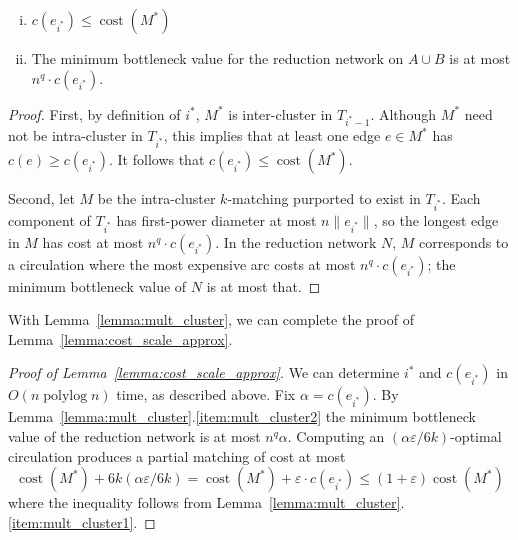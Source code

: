 \documentclass[a4paper,UKenglish]{socg-lipics-v2018}
\def\polylog{\mathop{\mathrm{polylog}}}
\def\eps{\varepsilon}
\def\norm#1{\mathopen\| #1 \mathclose\|}	%
\def\cost{\operatorname{cost}}
\theoremstyle{plain}
\numberwithin{figure}{section}
\begin{document}
\begin{toappendix}
\begin{lemma}
\label{lemma:mult_cluster}
\hspace{2em}
\begin{enumerate}[(i)]
\item \label{item:mult_cluster1}
	$c(e_{i^*}) \leq \cost(M^*)$
\item \label{item:mult_cluster2}
	The minimum bottleneck value for the reduction network on $A \cup B$
	is at most $n^q \cdot c(e_{i^*})$.
\end{enumerate}
\end{lemma}
\begin{proof}
First, by definition of $i^*$, $M^*$ is inter-cluster in $T_{i^*-1}$.
Although $M^*$ need not be intra-cluster in $T_{i^*}$, this implies that at
least one edge $e \in M^*$ has $c(e) \geq c(e_{i^*})$.
It follows that $c(e_{i^*}) \leq \cost(M^*)$.

Second, let $M$ be the intra-cluster $k$-matching purported to exist in $T_{i^*}$.
Each component of $T_{i^*}$ has first-power diameter at most $n\norm{e_{i^*}}$,
so the longest edge in $M$ has cost at most $n^q \cdot c(e_{i^*})$.
In the reduction network $N$, $M$ corresponds to a circulation
where the most expensive arc costs at most $n^q \cdot c(e_{i^*})$;
the minimum bottleneck value of $N$ is at most that.
\end{proof}

With Lemma~\ref{lemma:mult_cluster}, we can complete the proof of
Lemma~\ref{lemma:cost_scale_approx}.

\begin{proof}[Proof of Lemma~\ref{lemma:cost_scale_approx}]
We can determine $i^*$ and $c(e_{i^*})$ in $O(n\polylog n)$ time, as described above.
Fix $\alpha = c(e_{i^*})$.
By Lemma~\ref{lemma:mult_cluster}.\ref{item:mult_cluster2} the minimum
bottleneck value of the reduction network is at most $n^q \alpha$.
Computing an $(\alpha\eps/6k)$-optimal circulation produces a partial matching
of cost at most
\begin{equation*}
\cost(M^*) + 6k(\alpha\eps/6k) = \cost(M^*) + \eps \cdot c(e_{i^*})
	\leq (1+\eps) \cost(M^*)
\end{equation*}
where the inequality follows from Lemma~\ref{lemma:mult_cluster}.\ref{item:mult_cluster1}.
\end{proof}



\end{toappendix}
\end{document}
